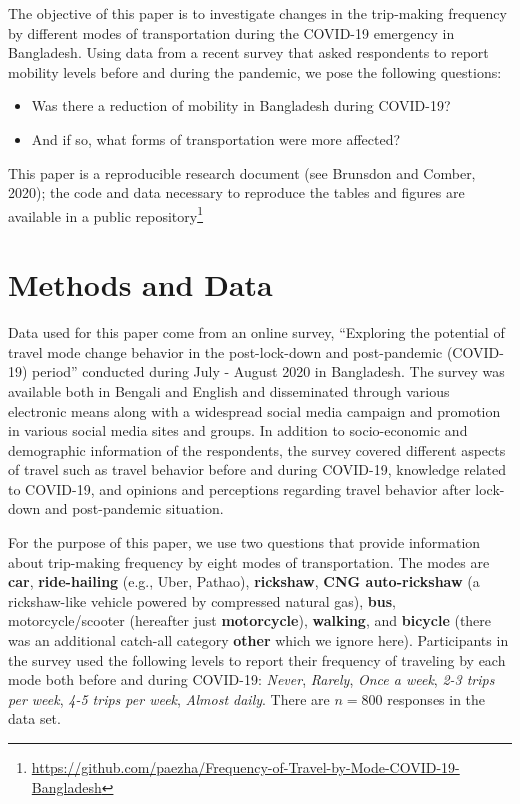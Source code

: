 \documentclass[]{elsarticle} %
\providecommand{\tightlist}{%
  \setlength{\itemsep}{0pt}\setlength{\parskip}{0pt}}
\begin{document}
The objective of this paper is to investigate changes in the trip-making
frequency by different modes of transportation during the COVID-19
emergency in Bangladesh. Using data from a recent survey that asked
respondents to report mobility levels before and during the pandemic, we
pose the following questions:

\begin{itemize}
\tightlist
\item
  Was there a reduction of mobility in Bangladesh during COVID-19?
\item
  And if so, what forms of transportation were more affected?
\end{itemize}

This paper is a reproducible research document (see Brunsdon and Comber,
2020); the code and data necessary to reproduce the tables and figures
are available in a public
repository\footnote{\url{https://github.com/paezha/Frequency-of-Travel-by-Mode-COVID-19-Bangladesh}}

\hypertarget{methods-and-data}{%
\section{Methods and Data}\label{methods-and-data}}

Data used for this paper come from an online survey, ``Exploring the
potential of travel mode change behavior in the post-lock-down and
post-pandemic (COVID-19) period'' conducted during July - August 2020 in
Bangladesh. The survey was available both in Bengali and English and
disseminated through various electronic means along with a widespread
social media campaign and promotion in various social media sites and
groups. In addition to socio-economic and demographic information of the
respondents, the survey covered different aspects of travel such as
travel behavior before and during COVID-19, knowledge related to
COVID-19, and opinions and perceptions regarding travel behavior after
lock-down and post-pandemic situation.

For the purpose of this paper, we use two questions that provide
information about trip-making frequency by eight modes of
transportation. The modes are \textbf{car}, \textbf{ride-hailing} (e.g.,
Uber, Pathao), \textbf{rickshaw}, \textbf{CNG auto-rickshaw} (a
rickshaw-like vehicle powered by compressed natural gas), \textbf{bus},
motorcycle/scooter (hereafter just \textbf{motorcycle}),
\textbf{walking}, and \textbf{bicycle} (there was an additional
catch-all category \textbf{other} which we ignore here). Participants in
the survey used the following levels to report their frequency of
traveling by each mode both before and during COVID-19: \emph{Never},
\emph{Rarely}, \emph{Once a week}, \emph{2-3 trips per week}, \emph{4-5
trips per week}, \emph{Almost daily}. There are \(n=800\) responses in
the data set.
\end{document}
